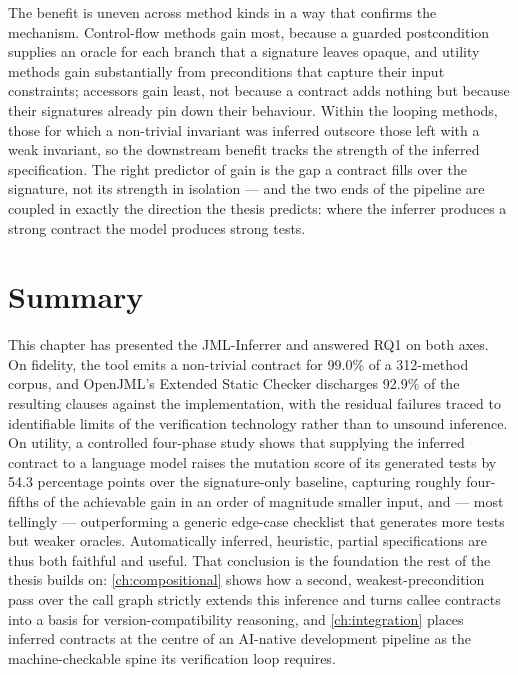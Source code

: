 The benefit is uneven across method kinds in a way that confirms the mechanism.
Control-flow methods gain most, because a guarded postcondition supplies an oracle
for each branch that a signature leaves opaque, and utility methods gain substantially
from preconditions that capture their input constraints; accessors gain least, not
because a contract adds nothing but because their signatures already pin down their
behaviour. Within the looping methods, those for which a non-trivial invariant was
inferred outscore those left with a weak invariant, so the downstream benefit tracks
the strength of the inferred specification. The right predictor of gain is the gap a
contract fills over the signature, not its strength in isolation --- and the two ends
of the pipeline are coupled in exactly the direction the thesis predicts: where the
inferrer produces a strong contract the model produces strong tests.

\section{Summary}
\label{sec:inf-summary}

This chapter has presented the JML-Inferrer and answered RQ1 on both axes. On
fidelity, the tool emits a non-trivial contract for 99.0\% of a 312-method corpus,
and OpenJML's Extended Static Checker discharges 92.9\% of the resulting clauses
against the implementation, with the residual failures traced to identifiable limits
of the verification technology rather than to unsound inference. On utility, a
controlled four-phase study shows that supplying the inferred contract to a language
model raises the mutation score of its generated tests by 54.3 percentage points
over the signature-only baseline, capturing roughly four-fifths of the achievable
gain in an order of magnitude smaller input, and --- most tellingly --- outperforming
a generic edge-case checklist that generates more tests but weaker oracles.
Automatically inferred, heuristic, partial specifications are thus both faithful and
useful. That conclusion is the foundation the rest of the thesis builds on:
\cref{ch:compositional} shows how a second, weakest-precondition pass over the call
graph strictly extends this inference and turns callee contracts into a basis for
version-compatibility reasoning, and \cref{ch:integration} places inferred contracts
at the centre of an AI-native development pipeline as the machine-checkable spine its
verification loop requires.
